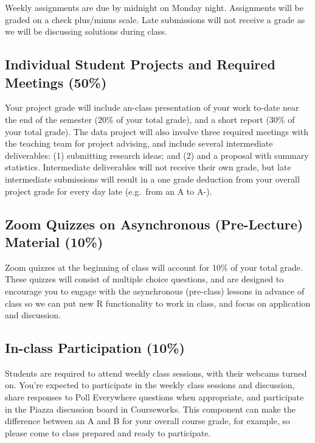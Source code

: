 \documentclass[11pt,]{article}
\begin{document}
Weekly assignments are due by midnight on Monday night. Assignments will
be graded on a check plus/minus scale. Late submissions will not receive
a grade as we will be discussing solutions during class.

\hypertarget{individual-student-projects-and-required-meetings-50}{%
\subsection{Individual Student Projects and Required Meetings
(50\%)}\label{individual-student-projects-and-required-meetings-50}}

Your project grade will include an-class presentation of your work
to-date near the end of the semester (20\% of your total grade), and a
short report (30\% of your total grade). The data project will also
involve three required meetings with the teaching team for project
advising, and include several intermediate deliverables: (1) submitting
research ideas; and (2) and a proposal with summary statistics.
Intermediate deliverables will not receive their own grade, but late
intermediate submissions will result in a one grade deduction from your
overall project grade for every day late (e.g.~from an A to A-).

\hypertarget{zoom-quizzes-on-asynchronous-pre-lecture-material-10}{%
\subsection{Zoom Quizzes on Asynchronous (Pre-Lecture) Material
(10\%)}\label{zoom-quizzes-on-asynchronous-pre-lecture-material-10}}

Zoom quizzes at the beginning of class will account for 10\% of your
total grade. These quizzes will consist of multiple choice questions,
and are designed to encourage you to engage with the asynchronous
(pre-class) lessons in advance of class so we can put new R
functionality to work in class, and focus on application and discussion.

\hypertarget{in-class-participation-10}{%
\subsection{In-class Participation
(10\%)}\label{in-class-participation-10}}

Students are required to attend weekly class sessions, with their
webcams turned on. You're expected to participate in the weekly class
sessions and discussion, share responses to Poll Everywhere questions
when appropriate, and participate in the Piazza discussion board in
Courseworks. This component can make the difference between an A and B
for your overall course grade, for example, so please come to class
prepared and ready to participate.
\end{document}
